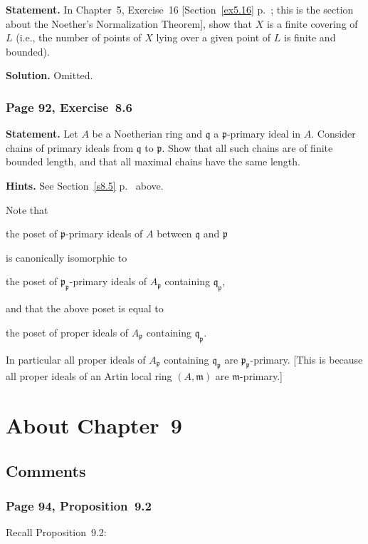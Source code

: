 \documentclass[12pt,letterpaper]{article}%
\newcommand{\mf}{\mathfrak}
\newcommand{\mmm}{\mf m}
\newcommand{\ppp}{\mf p}
\newcommand{\qqq}{\mf q}
\newcommand{\nn}{\noindent}
\begin{document}
\textbf{Statement.} In Chapter~5, Exercise~16 [Section~\ref{ex5.16} p.~\pageref{ex5.16}; this is the section about the Noether's Normalization Theorem], show that $X$ is a finite covering of $L$ (i.e., the number of points of $X$ lying over a given point of $L$ is finite and bounded).

\nn\textbf{Solution.} Omitted.%

\subsubsection{Page 92, Exercise~8.6}%

\textbf{Statement.} Let $A$ be a Noetherian ring and $\qqq$ a $\ppp$-primary ideal in $A$. Consider chains of primary ideals from $\qqq$ to $\ppp$. Show that all such chains are of finite bounded length, and that all maximal chains have the same length.

\nn\textbf{Hints.} See Section~\ref{s8.5} p.~\pageref{s8.5} above. 

Note that 

\qquad the poset of $\ppp$-primary ideals of $A$ between $\qqq$ and $\ppp$ 

is canonically isomorphic to 

\qquad the poset of $\ppp_\ppp$-primary ideals of $A_\ppp$ containing $\qqq_\ppp$, 

and that the above poset is equal to 

\qquad the poset of proper ideals of $A_\ppp$ containing $\qqq_\ppp$. 

In particular all proper ideals of $A_\ppp$ containing $\qqq_\ppp$ are $\ppp_\ppp$-primary. [This is because all proper ideals of an Artin local ring $(A,\mmm)$ are $\mmm$-primary.]

\newpage

\section{About Chapter~9}%

\subsection{Comments}%

\subsubsection{Page 94, Proposition~9.2}\label{sp9.2}%

Recall Proposition~9.2:
\end{document}
